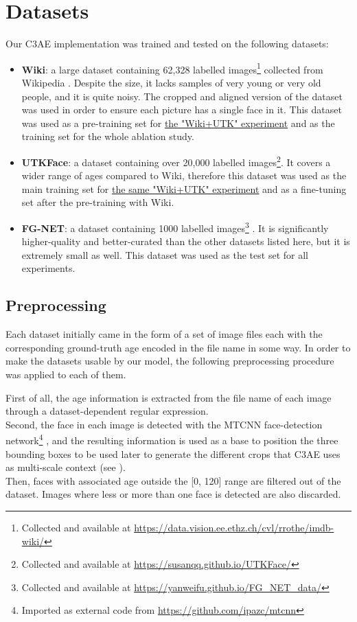 
\chapter{Datasets}

Our C3AE implementation was trained and tested on the following datasets:

\begin{itemize}
  \item \textbf{Wiki}:
    a large dataset containing 62,328 labelled
    images\footnote{Collected and available at \url{https://data.vision.ee.ethz.ch/cvl/rrothe/imdb-wiki/}}
    collected from Wikipedia \cite{wiki}.
    Despite the size, it lacks samples of very young
    or very old people, and it is quite noisy.
    The cropped and aligned version of the dataset
    was used in order to ensure each picture has a single face in it.
    This dataset was used as a pre-training set for
    \hyperref[subsec:wikiutk]{the "Wiki+UTK" experiment}
    and as the training set for the whole ablation study.
  \item \textbf{UTKFace}:
    a dataset containing over 20,000 labelled
    images\footnote{Collected and available at \url{https://susanqq.github.io/UTKFace/}}.
    It covers a wider range of ages compared to Wiki,
    therefore this dataset was used as the main training set
    for \hyperref[subsec:wikiutk]{the same "Wiki+UTK" experiment} 
    and as a fine-tuning set after the pre-training with Wiki.
  \item \textbf{FG-NET}:
    a dataset containing 1000 labelled
    images\footnote{Collected and available at \url{https://yanweifu.github.io/FG_NET_data/}}
    \cite{fgnet}.
    It is significantly higher-quality and better-curated than the other
    datasets listed here, but it is extremely small as well.
    This dataset was used as the test set for all experiments.
\end{itemize}

\section{Preprocessing}
Each dataset initially came in the form of a set of image files each with the
corresponding ground-truth age encoded in the file name in some way.
In order to make the datasets usable by our model, the following
preprocessing procedure was applied to each of them.

First of all, the age information is extracted from the file name of each
image through a dataset-dependent regular expression. \\
Second, the face in each image is detected with the MTCNN face-detection
network\footnote{Imported as external code from \url{https://github.com/ipazc/mtcnn}}
\cite{mtcnn}, and the resulting information is used as a base to position
the three bounding boxes to be used later to generate the different crops
that C3AE uses as multi-scale context (see ). \\
Then, faces with associated age outside the [0, 120] range are filtered
out of the dataset. Images where less or more than one face is detected
are also discarded.

